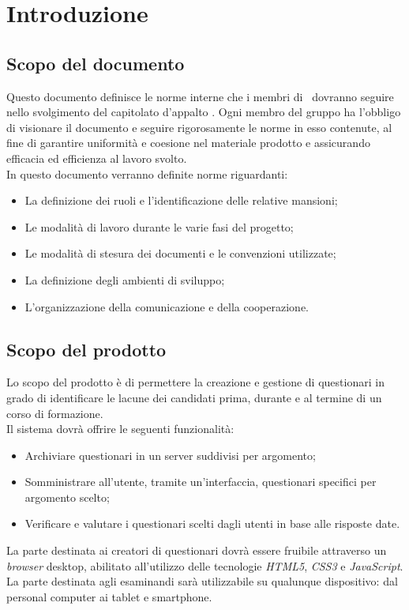\section{Introduzione}

\subsection{Scopo del documento}
Questo documento definisce le norme interne che i membri di \gruppo\ dovranno seguire nello svolgimento del capitolato d'appalto \progetto. Ogni membro del gruppo ha l'obbligo di visionare il documento e seguire rigorosamente le norme in esso contenute, al fine di garantire uniformità e coesione nel materiale prodotto e assicurando efficacia ed efficienza al lavoro svolto.
\\In questo documento verranno definite norme riguardanti:
\begin{itemize}
\item
La definizione dei ruoli e l'identificazione delle relative mansioni;	
\item
Le modalità di lavoro durante le varie fasi del progetto;
\item
Le modalità di stesura dei documenti e le convenzioni utilizzate;
\item
La definizione degli ambienti di sviluppo;
\item
L'organizzazione della comunicazione e della cooperazione.
\end{itemize}

\subsection{Scopo del prodotto}
Lo scopo del prodotto è di permettere la creazione e gestione di questionari in grado di identificare le lacune dei candidati prima, durante e al termine di un corso di formazione. 
\\Il sistema dovrà offrire le seguenti funzionalità:
\begin{itemize}
\item
Archiviare questionari in un server suddivisi per argomento;
\item
Somministrare all'utente, tramite un'interfaccia, questionari specifici per argomento scelto;
\item
Verificare e valutare i questionari scelti dagli utenti in base alle risposte date.
\end{itemize}
La parte destinata ai creatori di questionari dovrà essere fruibile attraverso un \textit{browser} desktop, abilitato all'utilizzo delle tecnologie \textit{HTML5}, \textit{CSS3} e \textit{JavaScript}. La parte destinata agli esaminandi sarà utilizzabile su qualunque dispositivo: dal personal computer ai tablet e smartphone.

